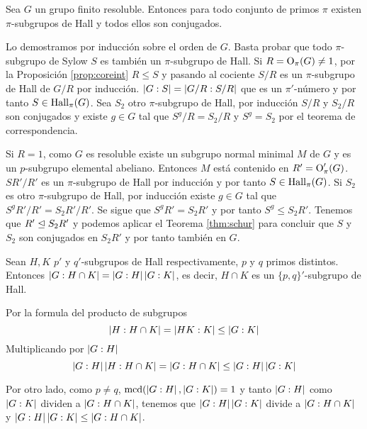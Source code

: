 \begin{teorema}
	Sea $G$ un grupo finito resoluble. Entonces para todo conjunto de primos $\pi$ existen $\pi$-subgrupos de Hall y todos ellos son conjugados.
	\begin{demostracion}
		Lo demostramos por inducción sobre el orden de $G$. Basta probar que todo $\pi$-subgrupo de Sylow $S$ es también un $\pi$-subgrupo de Hall.
		Si $R = \operatorname{O}_\pi(G) \neq 1$, por la Proposición \ref{prop:coreint} $R \leq S$ y pasando al cociente $S/R$ es un $\pi$-subgrupo de Hall de $G/R$ por inducción. $\left|G:S\right| = \left|G/R:S/R\right|$ que es un $\pi'$-número y por tanto $S \in \operatorname{Hall}_\pi(G)$. Sea $S_2$ otro $\pi$-subgrupo de Hall, por inducción $S/R$ y $S_2/R$ son conjugados y existe $g\in G$ tal que $S^g/R = S_2/R$ y $S^g=S_2$ por el teorema de correspondencia.
		
		Si $R=1$, como $G$ es resoluble existe un subgrupo normal minimal $M$ de $G$ y es un $p$-subgrupo elemental abeliano. Entonces $M$ está contenido en $R' = \operatorname{O}_\pi'(G)$. $SR'/R'$ es un $\pi$-subgrupo de Hall por inducción y por tanto $S\in \operatorname{Hall}_\pi(G)$. Si $S_2$ es otro $\pi$-subgrupo de Hall, por inducción existe $g\in G$ tal que $S^gR'/R'=S_2R'/R'$. Se sigue que $S^gR' = S_2R'$ y por tanto $S^g \leq S_2R'$. Tenemos que $R'\trianglelefteq S_2R'$ y podemos aplicar el Teorema \ref{thm:schur} para concluir que $S$ y $S_2$ son conjugados en $S_2R'$ y por tanto también en $G$.
	\end{demostracion}
\end{teorema}

\begin{lema}
	Sean $H, K$ $p'$ y $q'$-subgrupos de Hall respectivamente, $p$ y $q$ primos distintos. Entonces $\left|G:H\cap K\right| = \left|G:H\right|\left|G:K\right|$, es decir, $H\cap K$ es un $\{p,q\}'$-subgrupo de Hall.
	\begin{demostracion}
	 	Por la formula del producto de subgrupos
	 	\begin{equation*}
	 		\left|H:H\cap K\right| = \left|HK:K\right| \leq \left|G:K\right|
	 	\end{equation*}
	 	Multiplicando por $\left|G:H\right|$
	 	\begin{equation*}
	 		\left|G:H\right|\left|H:H\cap K\right| = \left|G:H\cap K\right| \leq \left|G:H\right|\left|G:K\right|
	 	\end{equation*}
	 	
	 	Por otro lado, como $p\neq q$, $\operatorname{mcd}(\left|G:H\right|,\left|G:K\right|) = 1$ y tanto $\left|G:H\right|$ como $\left|G:K\right|$ dividen a $\left|G:H\cap K\right|$, tenemos que $\left|G:H\right|\left|G:K\right|$ divide a $\left|G:H\cap K\right|$ y $\left|G:H\right|\left|G:K\right| \leq \left|G:H\cap K\right|$.
	\end{demostracion}
\end{lema}

